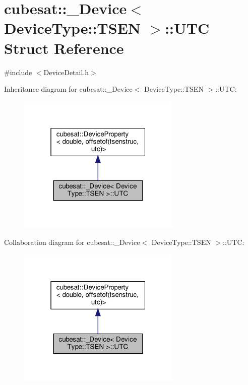 \hypertarget{structcubesat_1_1__Device_3_01DeviceType_1_1TSEN_01_4_1_1UTC}{}\section{cubesat\+:\+:\+\_\+\+Device$<$ Device\+Type\+:\+:T\+S\+EN $>$\+:\+:U\+TC Struct Reference}
\label{structcubesat_1_1__Device_3_01DeviceType_1_1TSEN_01_4_1_1UTC}


{\ttfamily \#include $<$Device\+Detail.\+h$>$}



Inheritance diagram for cubesat\+:\+:\+\_\+\+Device$<$ Device\+Type\+:\+:T\+S\+EN $>$\+:\+:U\+TC\+:\nopagebreak
\begin{figure}[H]
\begin{center}
\leavevmode
\includegraphics[width=220pt]{structcubesat_1_1__Device_3_01DeviceType_1_1TSEN_01_4_1_1UTC__inherit__graph}
\end{center}
\end{figure}


Collaboration diagram for cubesat\+:\+:\+\_\+\+Device$<$ Device\+Type\+:\+:T\+S\+EN $>$\+:\+:U\+TC\+:\nopagebreak
\begin{figure}[H]
\begin{center}
\leavevmode
\includegraphics[width=220pt]{structcubesat_1_1__Device_3_01DeviceType_1_1TSEN_01_4_1_1UTC__coll__graph}
\end{center}
\end{figure}
